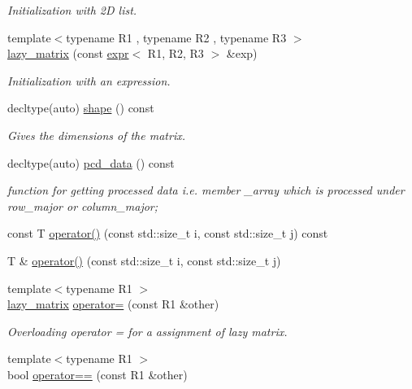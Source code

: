 \begin{DoxyCompactItemize}
\begin{DoxyCompactList}\small\item\em Initialization with 2D list. \end{DoxyCompactList}\item 
{\footnotesize template$<$typename R1 , typename R2 , typename R3 $>$ }\\\mbox{\hyperlink{classlazy__matrix_a7f5897589a5a5dd07ccdf73794e81d95}{lazy\+\_\+matrix}} (const \mbox{\hyperlink{classexpr}{expr}}$<$ R1, R2, R3 $>$ \&exp)
\begin{DoxyCompactList}\small\item\em Initialization with an expression. \end{DoxyCompactList}\item 
decltype(auto) \mbox{\hyperlink{classlazy__matrix_a4bcc0da3ca5bf4e297c91d48e5005369}{shape}} () const
\begin{DoxyCompactList}\small\item\em Gives the dimensions of the matrix. \end{DoxyCompactList}\item 
decltype(auto) \mbox{\hyperlink{classlazy__matrix_af88477b2ff394bf5b61b554f3017bf89}{pcd\+\_\+data}} () const
\begin{DoxyCompactList}\small\item\em function for getting processed data i.\+e. member \+\_\+array which is processed under row\+\_\+major or column\+\_\+major; \end{DoxyCompactList}\item 
const T \mbox{\hyperlink{classlazy__matrix_a8d253d7fc183071a524232ad43f5afec}{operator()}} (const std\+::size\+\_\+t i, const std\+::size\+\_\+t j) const
\item 
T \& \mbox{\hyperlink{classlazy__matrix_a43d4b192ebec1e2d246125be883d5a6e}{operator()}} (const std\+::size\+\_\+t i, const std\+::size\+\_\+t j)
\item 
{\footnotesize template$<$typename R1 $>$ }\\\mbox{\hyperlink{classlazy__matrix}{lazy\+\_\+matrix}} \mbox{\hyperlink{classlazy__matrix_ad30f653be1460b38c29fdc124d2b3e79}{operator=}} (const R1 \&other)
\begin{DoxyCompactList}\small\item\em Overloading operator = for a assignment of lazy matrix. \end{DoxyCompactList}\item 
{\footnotesize template$<$typename R1 $>$ }\\bool \mbox{\hyperlink{classlazy__matrix_aa3ddfb86317cbab26a9c3bb272a2f08f}{operator==}} (const R1 \&other)

\end{DoxyCompactItemize}
